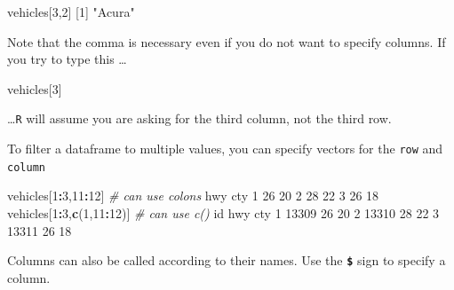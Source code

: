 \documentclass[
]{book}
\newenvironment{Shaded}{\begin{snugshade}}{\end{snugshade}}
\newcommand{\CommentTok}[1]{\textcolor[rgb]{0.56,0.35,0.01}{\textit{#1}}}
\newcommand{\DecValTok}[1]{\textcolor[rgb]{0.00,0.00,0.81}{#1}}
\newcommand{\FunctionTok}[1]{\textcolor[rgb]{0.13,0.29,0.53}{\textbf{#1}}}
\newcommand{\NormalTok}[1]{#1}
\newcommand{\SpecialCharTok}[1]{\textcolor[rgb]{0.81,0.36,0.00}{\textbf{#1}}}
\newcommand{\StringTok}[1]{\textcolor[rgb]{0.31,0.60,0.02}{#1}}
\begin{document}
\begin{Shaded}
\begin{Highlighting}[]
\NormalTok{vehicles[}\DecValTok{3}\NormalTok{,}\DecValTok{2}\NormalTok{]}
\NormalTok{[}\DecValTok{1}\NormalTok{] }\StringTok{"Acura"}
\end{Highlighting}
\end{Shaded}

Note that the comma is necessary even if you do not want to specify columns. If you try to type this \ldots{}

\begin{Shaded}
\begin{Highlighting}[]
\NormalTok{vehicles[}\DecValTok{3}\NormalTok{]}
\end{Highlighting}
\end{Shaded}

\ldots{}\texttt{R} will assume you are asking for the third column, not the third row.

To filter a dataframe to multiple values, you can specify vectors for the \texttt{row} and \texttt{column}

\begin{Shaded}
\begin{Highlighting}[]
\NormalTok{vehicles[}\DecValTok{1}\SpecialCharTok{:}\DecValTok{3}\NormalTok{,}\DecValTok{11}\SpecialCharTok{:}\DecValTok{12}\NormalTok{] }\CommentTok{\# can use colons}
\NormalTok{  hwy cty}
\DecValTok{1}  \DecValTok{26}  \DecValTok{20}
\DecValTok{2}  \DecValTok{28}  \DecValTok{22}
\DecValTok{3}  \DecValTok{26}  \DecValTok{18}
\NormalTok{vehicles[}\DecValTok{1}\SpecialCharTok{:}\DecValTok{3}\NormalTok{,}\FunctionTok{c}\NormalTok{(}\DecValTok{1}\NormalTok{,}\DecValTok{11}\SpecialCharTok{:}\DecValTok{12}\NormalTok{)]  }\CommentTok{\# can use c()}
\NormalTok{     id hwy cty}
\DecValTok{1} \DecValTok{13309}  \DecValTok{26}  \DecValTok{20}
\DecValTok{2} \DecValTok{13310}  \DecValTok{28}  \DecValTok{22}
\DecValTok{3} \DecValTok{13311}  \DecValTok{26}  \DecValTok{18}
\end{Highlighting}
\end{Shaded}

Columns can also be called according to their names. Use the \textbf{\texttt{\$}} sign to specify a column.

\begin{Shaded}
\end{Shaded}
\end{document}
